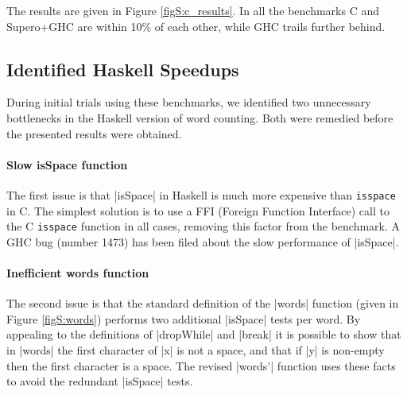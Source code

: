 The results are given in Figure \ref{figS:c_results}. In all the benchmarks C and Supero+GHC are within 10\% of each other, while GHC trails further behind.

\subsection{Identified Haskell Speedups}

During initial trials using these benchmarks, we identified two unnecessary bottlenecks in the Haskell version of word counting. Both were remedied before the presented results were obtained.

\paragraph{Slow \textsf{isSpace} function}

The first issue is that |isSpace| in Haskell is much more expensive than \texttt{isspace} in C. The simplest solution is to use a FFI (Foreign Function Interface) \cite{spj:awkward_squad} call to the C \texttt{isspace} function in all cases, removing this factor from the benchmark. A GHC bug (number 1473) has been filed about the slow performance of |isSpace|.


\paragraph{Inefficient \textsf{words} function}

The second issue is that the standard definition of the |words| function (given in Figure \ref{figS:words}) performs two additional |isSpace| tests per word. By appealing to the definitions of |dropWhile| and |break| it is possible to show that in |words| the first character of |x| is not a space, and that if |y| is non-empty then the first character is a space. The revised |words'| function uses these facts to avoid the redundant |isSpace| tests.

